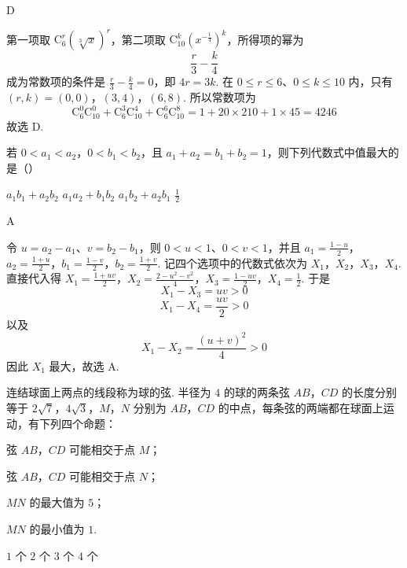 \begin{answer}
D
\end{answer}

\begin{solution}
第一项取 \(\mathrm C_6^r(\sqrt[3]{x})^r\)，第二项取 \(\mathrm C_{10}^k(x^{-\frac{1}{4}})^k\)，所得项的幂为
\[
\frac r3-\frac k4
\]
成为常数项的条件是 \(\frac r3-\frac k4=0\)，即 \(4r=3k\). 在 \(0\leqslant r\leqslant6\)、\(0\leqslant k\leqslant10\) 内，只有
\((r,k)=(0,0)\)，\((3,4)\)，\((6,8)\).
所以常数项为
\[
\mathrm C_6^0\mathrm C_{10}^0+\mathrm C_6^3\mathrm C_{10}^4+\mathrm C_6^6\mathrm C_{10}^8
=1+20\times210+1\times45=4246
\]
故选 D.
\end{solution}

\begin{problem}
若 \(0 < a_{1} < a_{2}\)，\(0 < b_{1} < b_{2}\)，且 \(a_{1} + a_{2} = b_{1} + b_{2} = 1\)，则下列代数式中值最大的是（\quad）

\choices
    {\(a_{1}b_{1} + a_{2}b_{2}\)}
    {\(a_{1}a_{2} + b_{1}b_{2}\)}
    {\(a_{1}b_{2} + a_{2}b_{1}\)}
    {\(\frac{1}{2}\)}
\end{problem}

\begin{answer}
A
\end{answer}

\begin{solution}
令 \(u=a_2-a_1\)、\(v=b_2-b_1\)，则 \(0<u<1\)、\(0<v<1\)，并且
\(a_1=\frac{1-u}{2}\)，\(a_2=\frac{1+u}{2}\)，\(b_1=\frac{1-v}{2}\)，\(b_2=\frac{1+v}{2}\).
记四个选项中的代数式依次为 \(X_1\)，\(X_2\)，\(X_3\)，\(X_4\). 直接代入得
\(X_1=\frac{1+uv}{2}\)，\(X_2=\frac{2-u^2-v^2}{4}\)，\(X_3=\frac{1-uv}{2}\)，\(X_4=\frac12\).
于是
\[
X_1-X_3=uv>0
\]
\[
X_1-X_4=\frac{uv}{2}>0
\]
以及
\[
X_1-X_2=\frac{(u+v)^2}{4}>0
\]
因此 \(X_1\) 最大，故选 A.
\end{solution}

\begin{problem}
连结球面上两点的线段称为球的弦. 半径为 \(4\) 的球的两条弦 \(AB\)，\(CD\) 的长度分别等于 \(2\sqrt{7}\)，\(4\sqrt{3}\)，\(M\)，\(N\) 分别为 \(AB\)，\(CD\) 的中点，每条弦的两端都在球面上运动，有下列四个命题：

\begin{circlelist}
\item 弦 \(AB\)，\(CD\) 可能相交于点 \(M\)；
\item 弦 \(AB\)，\(CD\) 可能相交于点 \(N\)；
\item \(MN\) 的最大值为 \(5\)；
\item \(MN\) 的最小值为 \(1\).
\end{circlelist}

\choices
    {\(1\) 个}
    {\(2\) 个}
    {\(3\) 个}
    {\(4\) 个}
\end{problem}

